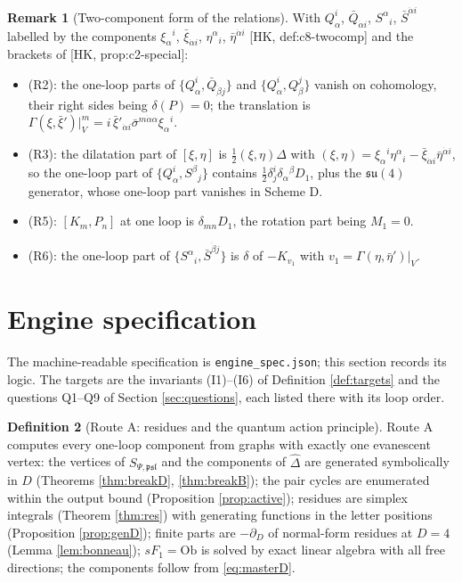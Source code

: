 \documentclass[11pt]{article}
\theoremstyle{definition}
\newtheorem{definition}{Definition}[section]
\newtheorem{remark}[definition]{Remark}
\numberwithin{equation}{section}
\begin{document}
\begin{remark}[Two-component form of the relations]
With $Q^i_\alpha$, $\bar Q_{\dot\alpha i}$, $S^\alpha{}_i$, $\bar S^{\dot\alpha i}$ labelled by the components $\xi_\alpha{}^i$, $\bar\xi_{\dot\alpha i}$, $\eta^\alpha{}_i$, $\bar\eta^{\dot\alpha i}$ [HK, def:c8-twocomp] and the brackets of [HK, prop:c2-special]:
\begin{itemize}
\item (R2): the one-loop parts of $\{Q^i_\alpha,\bar Q_{\dot\beta j}\}$ and $\{Q^i_\alpha,Q^j_\beta\}$ vanish on cohomology, their right sides being $\delta(P)=0$; the translation is $\Gamma(\xi,\bar\xi')|_V^m=i\,\bar\xi'_{\dot\alpha i}\bar\sigma^{m\dot\alpha\alpha}\xi_\alpha{}^i$.
\item (R3): the dilatation part of $[\xi,\eta]$ is $\frac12(\xi,\eta)\Delta$ with $(\xi,\eta)=\xi_\alpha{}^i\eta^\alpha{}_i-\bar\xi_{\dot\alpha i}\bar\eta^{\dot\alpha i}$, so the one-loop part of $\{Q^i_\alpha,S^\beta{}_j\}$ contains $\frac12\delta^i_j\delta_\alpha{}^\beta D_1$, plus the $\mathfrak{su}(4)$ generator, whose one-loop part vanishes in Scheme D.
\item (R5): $[K_m,P_n]$ at one loop is $\delta_{mn}D_1$, the rotation part being $M_1=0$.
\item (R6): the one-loop part of $\{S^\alpha{}_i,\bar S^{\dot\beta j}\}$ is $\delta$ of $-K_{v_1}$ with $v_1=\Gamma(\eta,\bar\eta')|_V$.
\end{itemize}
\end{remark}

\section{Engine specification}
\label{sec:engines}

The machine-readable specification is \texttt{engine\_spec.json}; this section records its logic. The targets are the invariants (I1)--(I6) of Definition \ref{def:targets} and the questions Q1--Q9 of Section \ref{sec:questions}, each listed there with its loop order.

\begin{definition}[Route A: residues and the quantum action principle]
\label{def:routeA}
Route A computes every one-loop component from graphs with exactly one evanescent vertex: the vertices of $S_{\Psi,\mathfrak{psl}}$ and the components of $\widehat\Delta$ are generated symbolically in $D$ (Theorems \ref{thm:breakD}, \ref{thm:breakB}); the pair cycles are enumerated within the output bound (Proposition \ref{prop:active}); residues are simplex integrals (Theorem \ref{thm:res}) with generating functions in the letter positions (Proposition \ref{prop:genD}); finite parts are $-\partial_D$ of normal-form residues at $D=4$ (Lemma \ref{lem:bonneau}); $sF_1=\mathrm{Ob}$ is solved by exact linear algebra with all free directions; the components follow from \eqref{eq:masterD}.
\end{definition}
\end{document}
